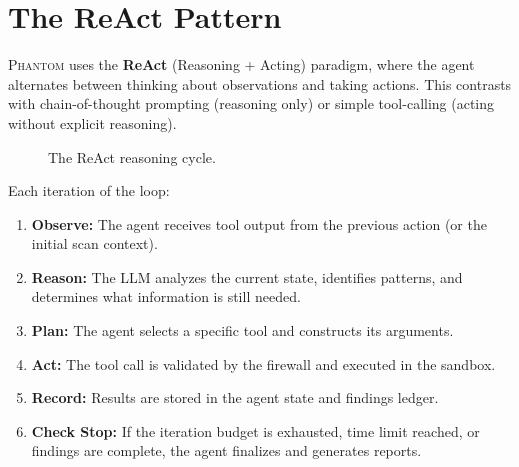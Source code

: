 \documentclass[12pt,a4paper,twoside]{report}
\makeatletter
\newcommand{\phantom@}{\textsc{Phantom}}
\makeatother
\begin{document}
\section{The ReAct Pattern}

\phantom@{} uses the \textbf{ReAct} (Reasoning + Acting) paradigm, where the agent alternates between thinking about observations and taking actions. This contrasts with chain-of-thought prompting (reasoning only) or simple tool-calling (acting without explicit reasoning).

\begin{figure}[H]
\centering
{}
\caption{The ReAct reasoning cycle.}
\label{fig:react}
\end{figure}

Each iteration of the loop:
\begin{enumerate}
    \item \textbf{Observe:} The agent receives tool output from the previous action (or the initial scan context).
    \item \textbf{Reason:} The LLM analyzes the current state, identifies patterns, and determines what information is still needed.
    \item \textbf{Plan:} The agent selects a specific tool and constructs its arguments.
    \item \textbf{Act:} The tool call is validated by the firewall and executed in the sandbox.
    \item \textbf{Record:} Results are stored in the agent state and findings ledger.
    \item \textbf{Check Stop:} If the iteration budget is exhausted, time limit reached, or findings are complete, the agent finalizes and generates reports.
\end{enumerate}
\end{document}
